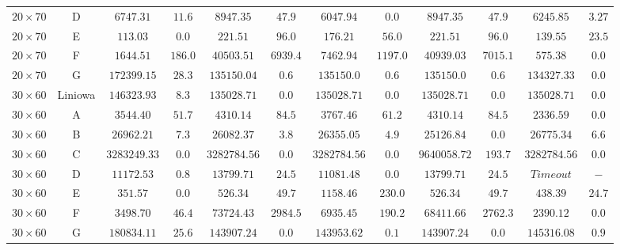 \begin{table}[h!]
\begin{center}
{\begin{tabular}{c|c|c|c|c|c|c|c|c|c|c|c}
            $20 \times 70$ & D           & $6747.31$ & $11.6$                    & $8947.35$ & $47.9$         & $6047.94$ & $0.0$         & $8947.35$ & $47.9$        & $6245.85$ & $3.27$ \\
            $20 \times 70$ & E           & $113.03$ & $0.0$                      & $221.51$ & $96.0$          & $176.21$ & $56.0$         & $221.51$ & $96.0$         & $139.55$ & $23.5$ \\
            $20 \times 70$ & F           & $1644.51$ & $186.0$                   & $40503.51$ & $6939.4$      & $7462.94$ & $1197.0$      & $40939.03$ & $7015.1$     & $575.38$ & $0.0$ \\
            $20 \times 70$ & G           & $172399.15$ & $28.3$                  & $135150.04$ & $0.6$        & $135150.0$ & $0.6$        & $135150.0$ & $0.6$        & $134327.33$ & $0.0$ \\
            \hline
            $30 \times 60$ & Liniowa     & $146323.93$ & $8.3$                   & $135028.71$ & $0.0$        & $135028.71$ & $0.0$       & $135028.71$ & $0.0$       & $135028.71$ & $0.0$ \\
            $30 \times 60$ & A           & $3544.40$ & $51.7$                    & $4310.14$ & $84.5$         & $3767.46$ & $61.2$        & $4310.14$ & $84.5$        & $2336.59$ & $0.0$ \\
            $30 \times 60$ & B           & $26962.21$ & $7.3$                    & $26082.37$ & $3.8$         & $26355.05$ & $4.9$        & $25126.84$ & $0.0$        & $26775.34$ & $6.6$ \\
            $30 \times 60$ & C           & $3283249.33$ & $0.0$                  & $3282784.56$ & $0.0$       & $3282784.56$ & $0.0$      & $9640058.72$ & $193.7$    & $3282784.56$ & $0.0$ \\
            $30 \times 60$ & D           & $11172.53$ & $0.8$                    & $13799.71$ & $24.5$        & $11081.48$ & $0.0$        & $13799.71$ & $24.5$       & $Time out$ & $-$ \\
            $30 \times 60$ & E           & $351.57$ & $0.0$                      & $526.34$ & $49.7$          & $1158.46$ & $230.0$       & $526.34$ & $49.7$         & $438.39$ & $24.7$ \\
            $30 \times 60$ & F           & $3498.70$ & $46.4$                    & $73724.43$ & $2984.5$      & $6935.45$ & $190.2$       & $68411.66$ & $2762.3$     & $2390.12$ & $0.0$ \\
            $30 \times 60$ & G           & $180834.11$ & $25.6$                  & $143907.24$ & $0.0$        & $143953.62$ & $0.1$       & $143907.24$ & $0.0$        & $145316.08$ & $0.9$ \\

\end{tabular}}
\end{center}
\end{table}
